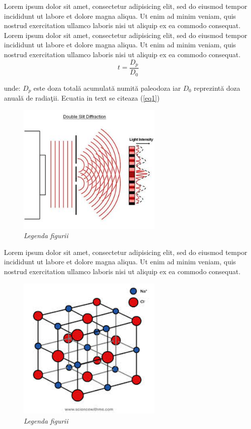 \documentclass[12pt,openright,twoside]{book}
\begin{document}
Lorem ipsum dolor sit amet, consectetur adipisicing elit, sed do eiusmod tempor incididunt ut labore et dolore magna aliqua. Ut enim ad minim veniam, quis nostrud exercitation ullamco laboris nisi ut aliquip ex ea commodo consequat.
\\


Lorem ipsum dolor sit amet, consectetur adipisicing elit, sed do eiusmod tempor incididunt ut labore et dolore magna aliqua. Ut enim ad minim veniam, quis nostrud exercitation ullamco laboris nisi ut aliquip ex ea commodo consequat.\\

\begin{equation}
t=\frac{D{_{p}}}{D{_{0}}}
\label{eq1}
\end{equation}

\vspace{14pt}

unde: ${D{_{p}}}$ este doza total\u{a} acumulat\u{a} numit\u{a} paleodoza iar ${D{_{0}}}$ reprezint\u{a} doza anual\u{a} de radia\c{t}ii. Ecuatia in text se citeaza (\ref{eq1})\\

\begin{figure}
\centering
\includegraphics[width=7cm]{figure1.jpg}
\caption{\textit{{\small Legenda figurii}}}
\end{figure}

Lorem ipsum dolor sit amet, consectetur adipisicing elit, sed do eiusmod tempor incididunt ut labore et dolore magna aliqua. Ut enim ad minim veniam, quis nostrud exercitation ullamco laboris nisi ut aliquip ex ea commodo consequat.\\

\begin{figure}
 \centering
\includegraphics[width=7cm]{figure2.jpg}
\caption{\textit{{\small Legenda figurii}}}
\label{fig1}
\end{figure}
\end{document}
